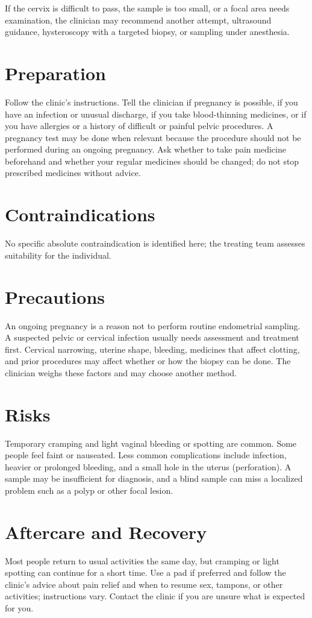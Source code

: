 If the cervix is difficult to pass, the sample is too small, or a focal area needs examination, the clinician may recommend another attempt, ultrasound guidance, hysteroscopy with a targeted biopsy, or sampling under anesthesia.

\section*{Preparation}
Follow the clinic's instructions. Tell the clinician if pregnancy is possible, if you have an infection or unusual discharge, if you take blood-thinning medicines, or if you have allergies or a history of difficult or painful pelvic procedures. A pregnancy test may be done when relevant because the procedure should not be performed during an ongoing pregnancy. Ask whether to take pain medicine beforehand and whether your regular medicines should be changed; do not stop prescribed medicines without advice.

\section*{Contraindications}
No specific absolute contraindication is identified here; the treating team assesses suitability for the individual.

\section*{Precautions}
An ongoing pregnancy is a reason not to perform routine endometrial sampling. A suspected pelvic or cervical infection usually needs assessment and treatment first. Cervical narrowing, uterine shape, bleeding, medicines that affect clotting, and prior procedures may affect whether or how the biopsy can be done. The clinician weighs these factors and may choose another method.

\section*{Risks}
Temporary cramping and light vaginal bleeding or spotting are common. Some people feel faint or nauseated. Less common complications include infection, heavier or prolonged bleeding, and a small hole in the uterus (perforation). A sample may be insufficient for diagnosis, and a blind sample can miss a localized problem such as a polyp or other focal lesion.

\section*{Aftercare and Recovery}
Most people return to usual activities the same day, but cramping or light spotting can continue for a short time. Use a pad if preferred and follow the clinic's advice about pain relief and when to resume sex, tampons, or other activities; instructions vary. Contact the clinic if you are unsure what is expected for you.

